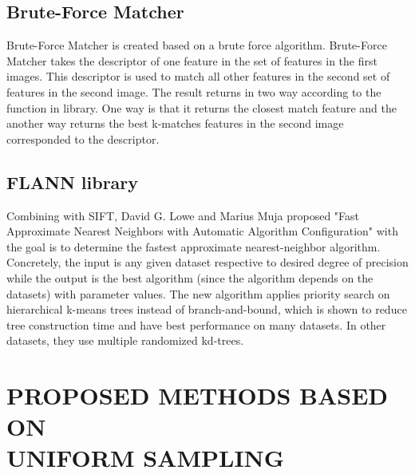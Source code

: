 \documentclass[letterpaper, 10 pt, conference]{ieeeconf}  %
\begin{document}
\subsection{Brute-Force Matcher}
Brute-Force Matcher is created based on a brute force algorithm\cite{opencv_library}. Brute-Force Matcher takes the descriptor of one feature in the set of features in the first images. This descriptor is used to match all other features in the second set of features in the second image. The result returns in two way according to the function in library. One way is that it returns the closest match feature and the another way returns the best k-matches features in the second image corresponded to the descriptor. 
\subsection{FLANN library}
Combining with SIFT\cite{sift},  David G. Lowe and Marius Muja proposed "Fast Approximate Nearest Neighbors with Automatic Algorithm Configuration" with the goal is to determine the fastest approximate nearest-neighbor algorithm\cite{flann}. Concretely, the input is any given dataset respective to desired degree of precision while the output is the best algorithm (since the algorithm depends on the datasets) with parameter values. The new algorithm applies priority search on hierarchical k-means trees instead of branch-and-bound, which is shown to reduce tree construction time and have best performance on many datasets. In other datasets, they use multiple randomized kd-trees. \par
\section{PROPOSED METHODS BASED ON \\UNIFORM SAMPLING}
\end{document}
